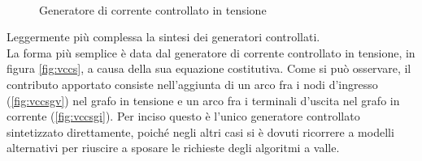 \begin{figure}[t]
 \centering
 \\
 \hspace{50pt}
 \caption{Generatore di corrente controllato in tensione}
 \label{fig:vccscmp}
\end{figure}

Leggermente più complessa la sintesi dei generatori controllati.\\
La forma più semplice è data dal generatore di corrente controllato in tensione, in figura \ref{fig:vccs}, a causa della sua equazione costitutiva. Come si può osservare, il contributo apportato consiste nell'aggiunta di un arco fra i nodi d'ingresso (\ref{fig:vccsgv}) nel grafo in tensione e un arco fra i terminali d'uscita nel grafo in corrente (\ref{fig:vccsgi}). Per inciso questo è l'unico generatore controllato sintetizzato direttamente, poiché negli altri casi si è dovuti ricorrere a modelli alternativi per riuscire a sposare le richieste degli algoritmi a valle.

